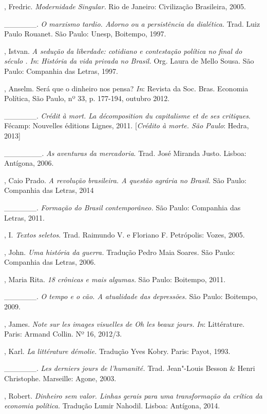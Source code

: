 \begin{Parskip}
, Fredric. \emph{Modernidade Singular.} Rio de Janeiro:
Civilização Brasileira, 2005.

\_\_\_\_\_\_. \emph{O marxismo tardio. Adorno ou a persistência da
dialética.} Trad. Luiz Paulo Rouanet. São Paulo: Unesp, Boitempo, 1997.

, Istvan. \emph{A sedução da liberdade: cotidiano e contestação
política no final do século . In}: \emph{História da vida privada
no Brasil.} Org. Laura de Mello Sousa. São Paulo: Companhia das Letras, 1997.

, Anselm. Será que o dinheiro nos pensa? \emph{In}: Revista da Soc. Bras.
Economia Política, São Paulo, nº 33, p. 177-194, outubro 2012.

\_\_\_\_\_\_. \emph{Crédit à mort. La décomposition du capitalisme et
de ses critiques}. Fécamp: Nouvelles éditions Lignes, 2011. [\emph{Crédito
à morte. São Paulo}: Hedra, 2013]

\_\_\_\_\_\_\_. \emph{As aventuras da mercadoria}. Trad. José
Miranda Justo. Lisboa: Antígona, 2006.

, Caio Prado. \emph{A revolução brasileira. A questão agrária no
Brasil.} São Paulo: Companhia das Letras, 2014

\_\_\_\_\_\_. \emph{Formação do Brasil contemporâneo.} São Paulo: Companhia das Letras, 2011.

, I. \emph{Textos seletos}. Trad. Raimundo V. e Floriano F.
Petrópolis: Vozes, 2005.

, John. \emph{Uma história da guerra.} Tradução Pedro Maia
Soares. São Paulo: Companhia das Letras, 2006.

, Maria Rita. \emph{18 crônicas e mais algumas.} São Paulo:
Boitempo, 2011.

\_\_\_\_\_\_. \emph{O tempo e o cão. A atualidade das depressões.} São
Paulo: Boitempo, 2009.

, James. \emph{Note sur les images visuelles de \emph{Oh les
beaux jours}.} \emph{In}: Littérature. Paris: Armand Collin. Nº 16, 2012/3.

, Karl. \emph{La littérature démolie.} Tradução Yves Kobry.
Paris: Payot, 1993.

\_\_\_\_\_\_. \emph{Les derniers jours de l'humanité.} Trad. Jean"-Louis
Besson \& Henri Christophe. Marseille: Agone, 2003.

, Robert. \emph{Dinheiro sem valor. Linhas gerais para uma
transformação da crítica da economia política.} Tradução Lumir Nahodil.
Lisboa: Antígona, 2014.


\end{Parskip}
